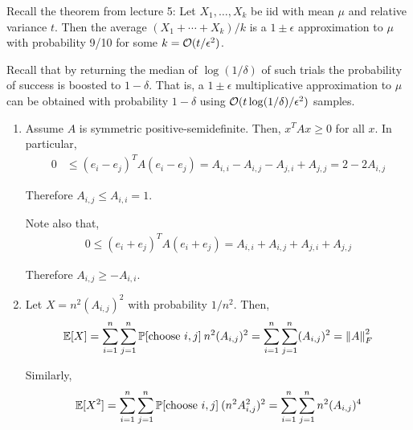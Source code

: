 \documentclass[10pt]{article}
\begin{document}
\begin{solution}[Solution]

Recall the theorem from lecture 5:
    Let \( X_1,\ldots, X_k \) be iid with mean \( \mu \) and relative variance \( t \). Then the average \( (X_1+ \cdots + X_k)/k \) is a \( 1\pm \epsilon \) approximation to \( \mu \) with probability 9/10 for some \( k = \mathcal{O}(t/\epsilon^2) \).

    Recall that by returning the median of \( \log(1/\delta) \) of such trials the probability of success is boosted to \( 1-\delta \). That is, a \( 1 \pm \epsilon \) multiplicative approximation to \( \mu \) can be obtained with probability \( 1-\delta \) using \( \mathcal{O}(t\log(1/\delta)/\epsilon^2) \) samples.

\begin{enumerate}[label=(\alph*)]
    \item Assume \( A \) is symmetric positive-semidefinite. Then, \( x^TAx\geq 0 \) for all \( x \). In particular,
        \begin{align*}
            0 &\leq (e_i-e_j)^TA(e_i-e_j) 
            = A_{i,i} - A_{i,j} - A_{j,i} + A_{j,j}
            = 2 - 2A_{i,j}
        \end{align*}
        
        Therefore \( A_{i,j} \leq A_{i,i} = 1 \).

        Note also that,
        \begin{align*}
            0 \leq (e_i+e_j)^TA(e_i+e_j)
            = A_{i,i} + A_{i,j} + A_{j,i} + A_{j,j}
        \end{align*}
        
        Therefore \( A_{i,j} \geq - A_{i,i} \).

    \item


        Let \( X = n^2 (A_{i,j})^2 \) with probability \( 1/n^2 \). Then,
        \begin{align*}
            \mathbb{E}[X] = \sum_{i=1}^{n} \sum_{j=1}^{n} \mathbb{P}[\text{choose }i,j] \: n^2 (A_{i,j})^2 
            = \sum_{i=1}^{n} \sum_{j=1}^{n} (A_{i,j})^2
            = \left\lVert A\right\rVert_F^2
        \end{align*}
        
        Similarly,
        \begin{align*}
            \mathbb{E}[X^2] = \sum_{i=1}^{n} \sum_{j=1}^{n} \mathbb{P}[\text{choose }i,j] \: (n^2 A_{i,j}^2)^2 
            = \sum_{i=1}^{n} \sum_{j=1}^{n} n^2(A_{i,j})^4
        \end{align*}


\end{enumerate}
\end{solution}
\end{document}
